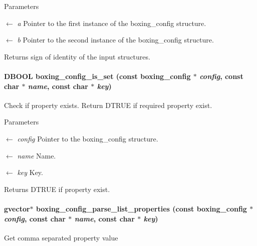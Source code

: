 \begin{DoxyParams}{Parameters}
\item[\mbox{$\leftarrow$} {\em a}]Pointer to the first instance of the boxing\_\-config structure. \item[\mbox{$\leftarrow$} {\em b}]Pointer to the second instance of the boxing\_\-config structure. \end{DoxyParams}
\begin{DoxyReturn}{Returns}
sign of identity of the input structures. 
\end{DoxyReturn}
\hypertarget{group__config_ga38dd7ef844687d0aeb7c320d23a50cf1}{
\paragraph[{boxing\_\-config\_\-is\_\-set}]{\setlength{\rightskip}{0pt plus 5cm}DBOOL boxing\_\-config\_\-is\_\-set (const {\bf boxing\_\-config} $\ast$ {\em config}, \/  const char $\ast$ {\em name}, \/  const char $\ast$ {\em key})}\hfill}
\label{group__config_ga38dd7ef844687d0aeb7c320d23a50cf1}
Check if property exists. Return DTRUE if required property exist.


\begin{DoxyParams}{Parameters}
\item[\mbox{$\leftarrow$} {\em config}]Pointer to the boxing\_\-config structure. \item[\mbox{$\leftarrow$} {\em name}]Name. \item[\mbox{$\leftarrow$} {\em key}]Key. \end{DoxyParams}
\begin{DoxyReturn}{Returns}
DTRUE if property exist. 
\end{DoxyReturn}
\hypertarget{group__config_ga74a3b76919775886d79bb478e6c515d1}{
\paragraph[{boxing\_\-config\_\-parse\_\-list\_\-properties}]{\setlength{\rightskip}{0pt plus 5cm}gvector$\ast$ boxing\_\-config\_\-parse\_\-list\_\-properties (const {\bf boxing\_\-config} $\ast$ {\em config}, \/  const char $\ast$ {\em name}, \/  const char $\ast$ {\em key})}\hfill}
\label{group__config_ga74a3b76919775886d79bb478e6c515d1}
Get comma separated property value



